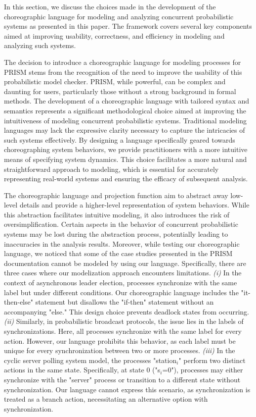 In this section, we discuss the choices made in the development of the choreographic language for modeling and analyzing concurrent probabilistic systems as presented in this paper. The framework covers  several key components aimed at improving usability, correctness, and efficiency in modeling and analyzing such systems.

The decision to introduce a choreographic language for modeling processes for PRISM stems from the recognition of the need to improve the usability of this probabilistic model checker. PRISM, while powerful, can be complex and daunting for users, particularly those without a strong background in formal methods. 
The development of a choreographic language with tailored syntax and semantics represents a significant methodological choice aimed at improving the intuitiveness of modeling concurrent probabilistic systems. Traditional modeling languages may lack the expressive clarity necessary to capture the intricacies of such systems effectively. By designing a language specifically geared towards choreographing system behaviors, we provide practitioners with a more intuitive means of specifying system dynamics. This choice facilitates a more natural and straightforward approach to modeling, which is essential for accurately representing real-world systems and ensuring the efficacy of subsequent analysis.

The choreographic language and projection function aim to abstract away low-level details and provide a higher-level representation of system behaviors. While this abstraction facilitates intuitive modeling, it also introduces the risk of oversimplification. Certain aspects in the behavior of concurrent probabilistic systems may be lost during the abstraction process, potentially leading to inaccuracies in the analysis results. Moreover, while testing our choreographic language, we noticed that some of the case studies presented in the 
PRISM documentation \cite{PRISMdoc} cannot be modeled by using our language. Specifically, there are three cases where our modelization approach encounters limitations.
\textit{(i)} In the context of asynchronous leader election, processes synchronize with the same label but under different conditions. Our choreographic language includes the "it-then-else" statement but disallows the "if-then" statement without an accompanying "else." This design choice prevents deadlock states from occurring.
\textit{(ii)} Similarly, in probabilistic broadcast protocols, the issue lies in the labels of synchronizations. Here, all processes synchronize with the same label for every action. However, our language prohibits this behavior, as each label must be unique for every synchronization between two or more processes.
\textit{(iii)} In the cyclic server polling system model, the processes "station$_i$" perform two distinct actions in the same state. Specifically, at state 0 ("s$_i$=0"), processes may either synchronize with the "server" process or transition to a different state without synchronization. Our language cannot express this scenario, as synchronization is treated as a branch action, necessitating an alternative option with synchronization.


